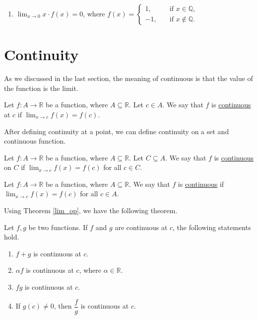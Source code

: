 \documentclass[11pt]{book}
\theoremstyle{break}
\theoremstyle{no_label}
\newcommand{\bbR}{\mathbb{R}}
\numberwithin{equation}{section}
\begin{document}
\begin{enumerate}[label=\arabic*.]
\begin{enumerate}
            \setlength{\delimitershortfall}{13.5pt}
            \item $\displaystyle\lim_{x\to 0}x\cdot f(x)=0$, where $f(x)=\left\{\begin{array}{rl}
                1,\quad & \text{if $x\in\mathbb{Q}$},\\
                -1,\quad & \text{if $x\notin\mathbb{Q}$}.
            \end{array}\right.$
            \setlength{\delimitershortfall}{0pt}
        \end{enumerate}
    \setlength{\delimitershortfall}{13.5pt}
\end{enumerate}

\section{Continuity}

As we discussed in the last section, the meaning of continuous is that the value of the function is the limit.

\begin{definition}[Continuous]
    Let $f:A\to\bbR$ be a function, where $A\subseteq\bbR$. Let $c\in A$. We say that $f$ is \underline{continuous} at $c$ if $\displaystyle\lim_{x\to c}f(x)=f(c)$.
\end{definition}

After defining continuity at a point, we can define continuity on a set and continuous function.

\begin{definition}[Continuous]
    Let $f:A\to\bbR$ be a function, where $A\subseteq\bbR$. Let $C\subseteq A$. We say that $f$ is \underline{continuous} on $C$ if $\displaystyle\lim_{x\to c}f(x)=f(c)$ for all $c\in C$.
\end{definition}

\begin{definition}[Continuous]
    Let $f:A\to\bbR$ be a function, where $A\subseteq\bbR$. We say that $f$ is \underline{continuous} if $\displaystyle\lim_{x\to c}f(x)=f(c)$ for all $c\in A$.
\end{definition}

Using Theorem \ref{lim_op}, we have the following theorem.

\begin{theorem}\label{conti_op}
    Let $f, g$ be two functions. If $f$ and $g$ are continuous at $c$, the following statements hold.
    \begin{enumerate}
        \item $f+g$ is continuous at $c$.
        \item $\alpha f$ is continuous at $c$, where $\alpha\in\bbR$.
        \item $fg$ is continuous at $c$.
        \item If $g(c)\ne0$, then $\dfrac{f}{g}$ is continuous at $c$.
    \end{enumerate}
\end{theorem}
\end{document}
